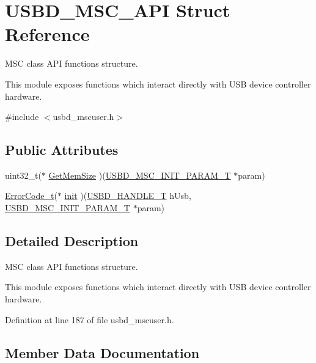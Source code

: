\hypertarget{struct_u_s_b_d___m_s_c___a_p_i}{}\section{U\+S\+B\+D\+\_\+\+M\+S\+C\+\_\+\+A\+PI Struct Reference}
\label{struct_u_s_b_d___m_s_c___a_p_i}


M\+SC class A\+PI functions structure.

This module exposes functions which interact directly with U\+SB device controller hardware.  




{\ttfamily \#include $<$usbd\+\_\+mscuser.\+h$>$}

\subsection*{Public Attributes}
\begin{DoxyCompactItemize}
\item 
uint32\+\_\+t($\ast$ \hyperlink{struct_u_s_b_d___m_s_c___a_p_i_a73a9d240b20fcd83e6d2c9675420d626}{Get\+Mem\+Size} )(\hyperlink{group___u_s_b_d___m_s_c_ga01cbe726c0ee97ee44661ca88d7e8fbd}{U\+S\+B\+D\+\_\+\+M\+S\+C\+\_\+\+I\+N\+I\+T\+\_\+\+P\+A\+R\+A\+M\+\_\+T} $\ast$param)
\item 
\hyperlink{error_8h_a905255056c349318139d94aa4523d516}{Error\+Code\+\_\+t}($\ast$ \hyperlink{struct_u_s_b_d___m_s_c___a_p_i_a2654b01293392f8a58412e88b46f1e91}{init} )(\hyperlink{group___u_s_b_d___core_gafdbb2204d929cb9d75736bd2b42342ac}{U\+S\+B\+D\+\_\+\+H\+A\+N\+D\+L\+E\+\_\+T} h\+Usb, \hyperlink{group___u_s_b_d___m_s_c_ga01cbe726c0ee97ee44661ca88d7e8fbd}{U\+S\+B\+D\+\_\+\+M\+S\+C\+\_\+\+I\+N\+I\+T\+\_\+\+P\+A\+R\+A\+M\+\_\+T} $\ast$param)
\end{DoxyCompactItemize}


\subsection{Detailed Description}
M\+SC class A\+PI functions structure.

This module exposes functions which interact directly with U\+SB device controller hardware. 



Definition at line 187 of file usbd\+\_\+mscuser.\+h.



\subsection{Member Data Documentation}
\mbox{\label{struct_u_s_b_d___m_s_c___a_p_i_a73a9d240b20fcd83e6d2c9675420d626}} 
